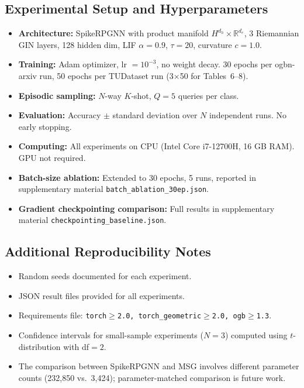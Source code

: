 \subsection*{Experimental Setup and Hyperparameters}

\begin{itemize}
    \item \textbf{Architecture:} SpikeRPGNN with product manifold $H^{d_h}{\times}\mathbb{R}^{d_e}$, 3 Riemannian GIN layers, 128 hidden dim, LIF $\alpha{=}0.9$, $\tau{=}20$, curvature $c{=}1.0$.
    \item \textbf{Training:} Adam optimizer, lr $=10^{-3}$, no weight decay. 30 epochs per ogbn-arxiv run, 50 epochs per TUDataset run (3$\times$50 for Tables~6--8).
    \item \textbf{Episodic sampling:} $N$-way $K$-shot, $Q{=}5$ queries per class.
    \item \textbf{Evaluation:} Accuracy $\pm$ standard deviation over $N$ independent runs. No early stopping.
    \item \textbf{Computing:} All experiments on CPU (Intel Core i7-12700H, 16 GB RAM). GPU not required.
    \item \textbf{Batch-size ablation:} Extended to 30 epochs, 5 runs, reported in supplementary material \texttt{batch\_ablation\_30ep.json}.
    \item \textbf{Gradient checkpointing comparison:} Full results in supplementary material \texttt{checkpointing\_baseline.json}.
\end{itemize}

\subsection*{Additional Reproducibility Notes}

\begin{itemize}
    \item[\checkmark] Random seeds documented for each experiment.
    \item[\checkmark] JSON result files provided for all experiments.
    \item[\checkmark] Requirements file: \texttt{torch$\ge$2.0, torch\_geometric$\ge$2.0, ogb$\ge$1.3}.
    \item[-] Confidence intervals for small-sample experiments ($N{=}3$) computed using $t$-distribution with df${=}2$.
    \item[-] The comparison between SpikeRPGNN and MSG involves different parameter counts (232,850 vs.\ 3,424); parameter-matched comparison is future work.
\end{itemize}
